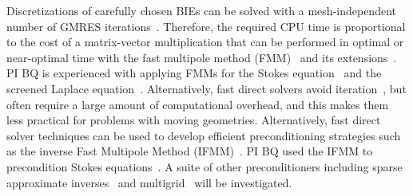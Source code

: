 %
Discretizations of carefully chosen BIEs can be solved with a
mesh-independent number of GMRES
iterations~\cite{cam-ips-kel-mey-xue1996}. Therefore, the required CPU
time is proportional to the cost of a matrix-vector multiplication that
can be performed in optimal or near-optimal time with the fast multipole
method (FMM)~\cite{fmm5} and its extensions~\cite{fmm1, fmm2, fmm3,
fmm4, fmm6, fmm7, fmm8}. PI BQ is experienced with applying FMMs for the
Stokes equation~\cite{qua-bir2014, bys-sha-qua2020} and the screened
Laplace equation~\cite{kro-qua2011, qua2011}.  Alternatively, fast
direct solvers avoid iteration~\cite{fds2, fds3, fds4, fds5, fds6, fds7,
ho2016cpam1, minden2016, minden2017siammms}, but often require a large
amount of computational overhead, and this makes them less practical for
problems with moving geometries. Alternatively, fast direct solver
techniques can be used to develop efficient preconditioning strategies
such as the inverse Fast Multipole Method (IFMM)~\cite{cou-pou-dar2017}.
PI BQ used the IFMM to precondition Stokes
equations~\cite{qua-cou-dar2018}. A suite of other preconditioners
including sparse approximate inverses~\cite{che2000} and
multigrid~\cite{hem-sch1981, sch1982} will be investigated.
%
